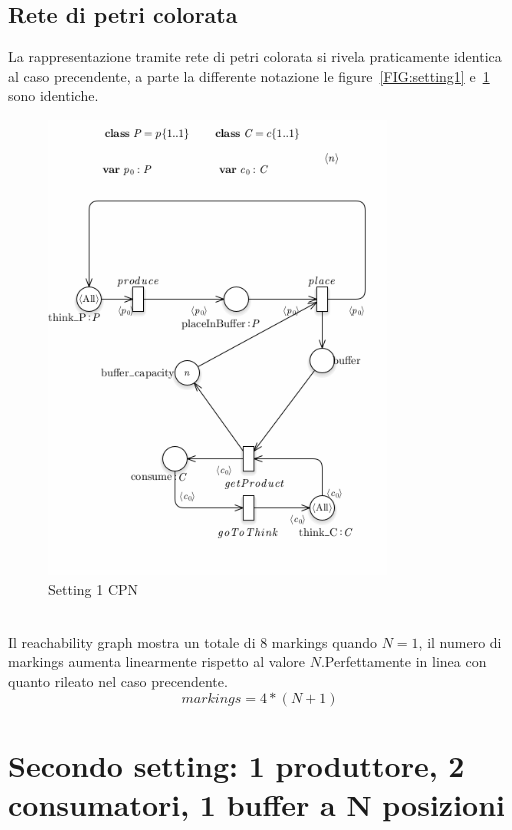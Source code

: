 \documentclass{article}
\begin{document}
\subsection{Rete di petri colorata}
La rappresentazione tramite rete di petri colorata si rivela praticamente identica al caso precendente, a parte la differente notazione le figure~\ref{FIG:setting1} e~\ref{FIG:setting1_CPN} sono identiche.
\begin{figure}[!ht]
\centering
\includegraphics[width=0.8\textwidth]{./Esercizio2_img/setting_1_CPN.png}
\caption{Setting 1 CPN} \label{FIG:setting1_CPN}
\end{figure}\\
Il reachability graph mostra un totale di 8 markings quando $N =1$, il numero di markings aumenta linearmente rispetto al valore $N$.Perfettamente in linea con quanto rileato nel caso precendente.
$$markings = 4*(N + 1)$$
\newpage
\section{Secondo  setting: 1 produttore, 2 consumatori,  1 buffer a N posizioni}\label{SEC:secondo}
\end{document}
